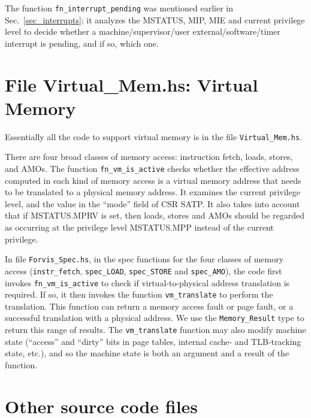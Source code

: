 \documentclass[11pt]{article}
\begin{document}
The function \verb|fn_interrupt_pending| was mentioned earlier in
Sec.~\ref{sec_interrupts}; it analyzes the MSTATUS, MIP, MIE and
current privilege level to decide whether a machine/supervisor/user
external/software/timer interrupt is pending, and if so, which one.


\section{File Virtual\_Mem.hs: Virtual Memory}

\label{sec_vm}

Essentially all the code to support virtual memory is in the file
\verb|Virtual_Mem.hs|.

There are four broad classes of memory access: instruction fetch,
loads, stores, and AMOs.  The function \verb|fn_vm_is_active| checks
whether the effective address computed in each kind of memory access
is a virtual memory address that needs to be translated to a physical
memory address.  It examines the current privilege level, and the
value in the ``mode'' field of CSR SATP.  It also takes into account
that if MSTATUS.MPRV is set, then loads, stores and AMOs should be
regarded as occurring at the privilege level MSTATUS.MPP instead of
the current privilege.



In file \verb|Forvis_Spec.hs|, in the spec functions for the four
classes of memory access (\verb|instr_fetch|, \verb|spec_LOAD|,
\verb|spec_STORE| and \verb|spec_AMO|), the code first invokes
\verb|fn_vm_is_active| to check if virtual-to-physical address
translation is required.  If so, it then invokes the function
\verb|vm_translate| to perform the translation.  This function can
return a memory access fault or page fault, or a successful
translation with a physical address.  We use the \verb|Memory_Result|
type to return this range of results.  The \verb|vm_translate|
function may also modify machine state (``access'' and ``dirty'' bits
in page tables, internal cache- and TLB-tracking state, etc.), and so
the machine state is both an argument and a result of the function.




\section{Other source code files}
\end{document}

